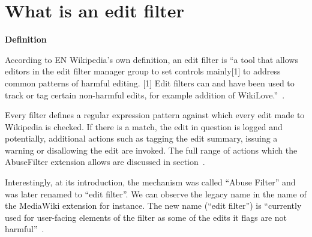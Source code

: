 \documentclass{sigchi}
\begin{document}

\section{What is an edit filter}

\textbf{Definition}

According to EN Wikipedia's own definition, an edit filter is ``a tool that allows editors in the edit filter manager group to set controls mainly[1] to address common patterns of harmful editing.
[1] Edit filters can and have been used to track or tag certain non-harmful edits, for example addition of WikiLove.''~\cite{Wikipedia:EditFilter}.

Every filter defines a regular expression pattern against which every edit made to Wikipedia is checked.
If there is a match, the edit in question is logged and potentially, additional actions such as tagging the edit summary, issuing a warning or disallowing the edit are invoked.
The full range of actions which the AbuseFilter extension allows are discussed in section~\label{sec:technical-layer}.

Interestingly, at its introduction, the mechanism was called ``Abuse Filter'' and was later renamed to ``edit filter''.
We can observe the legacy name in the name of the MediaWiki extension for instance.
The new name (``edit filter'') is ``currently used for user-facing elements of the filter as some of the edits it flags are not harmful''~\cite{Wikipedia:EditFilter}.

\end{document}
